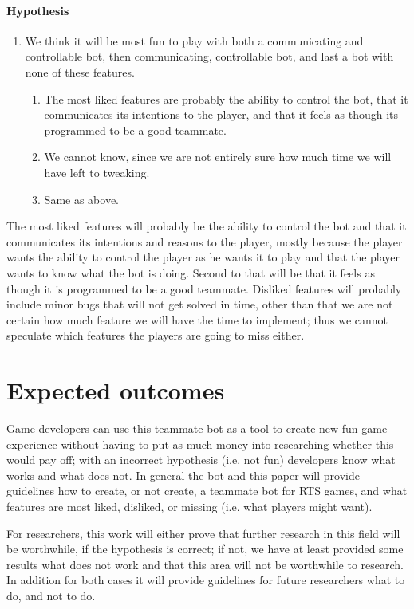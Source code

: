 \paragraph{Hypothesis}
\begin{enumerate}
	\item We think it will be most fun to play with both a communicating and controllable bot, then communicating, controllable bot, and last a bot with none of these features.
	\begin{enumerate}
		\item The most liked features are probably the ability to control the bot, that it communicates its intentions to the player, and that it feels as though its programmed to be a good teammate.
		\item We cannot know, since we are not entirely sure how much time we will have left to tweaking.
		\item Same as above.
	\end{enumerate}
\end{enumerate}

The most liked features will probably be the ability to control the bot and that it communicates its intentions and reasons to the player, mostly because the player wants the ability to control the player as he wants it to play and that the player wants to know what the bot is doing. Second to that will be that it feels as though it is programmed to be a good teammate. Disliked features will probably include minor bugs that will not get solved in time, other than that we are not certain how much feature we will have the time to implement; thus we cannot speculate which features the players are going to miss either.

\section{Expected outcomes}
Game developers can use this teammate bot as a tool to create new fun game experience without having to put as much money into researching whether this would pay off; with an incorrect hypothesis (i.e. not fun) developers know what works and what does not. In general the bot and this paper will provide guidelines how to create, or not create, a teammate bot for RTS games, and what features are most liked, disliked, or missing (i.e. what players might want).

For researchers, this work will either prove that further research in this field will be worthwhile, if the hypothesis is correct; if not, we have at least provided some results what does not work and that this area will not be worthwhile to research. In addition for both cases it will provide guidelines for future researchers what to do, and not to do.
